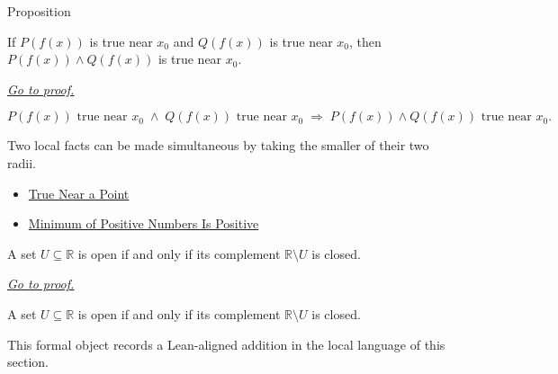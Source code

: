 \begin{propositionbox}{Proposition}
\begin{proposition}
\label{prop:true-near-stable-under-conjunction}
If \(P(f(x))\) is true near \(x_0\) and \(Q(f(x))\) is true near \(x_0\),
then \(P(f(x))\wedge Q(f(x))\) is true near \(x_0\).

\smallskip\noindent
\hyperref[prf:true-near-stable-under-conjunction]{\textit{Go to proof.}}
\end{proposition}
\end{propositionbox}

\begin{remark*}
\[
  P(f(x))\text{ true near }x_0
  \;\wedge\;
  Q(f(x))\text{ true near }x_0
  \;\Longrightarrow\;
  P(f(x))\wedge Q(f(x))\text{ true near }x_0.
\]
\end{remark*}

\begin{remark*}[Interpretation]
Two local facts can be made simultaneous by taking the smaller of their two
radii.
\end{remark*}

\begin{dependencies}
\begin{itemize}
  \item \hyperref[def:true-near]{True Near a Point}
  \item \hyperref[lem:minimum-of-positive-numbers-is-positive]{Minimum of Positive Numbers Is Positive}
\end{itemize}
\end{dependencies}

\begin{theorem}
\label{thm:open-iff-complement-closed}
A set $U\subseteq\mathbb R$ is open if and only if its complement $\mathbb R\setminus U$ is closed.

\smallskip
\noindent
\hyperref[prf:open-iff-complement-closed]{\textit{Go to proof.}}
\end{theorem}

\begin{remark*}
A set $U\subseteq\mathbb R$ is open if and only if its complement $\mathbb R\setminus U$ is closed.
\end{remark*}

\begin{remark*}[Interpretation]
This formal object records a Lean-aligned addition in the local language of this section.
\end{remark*}

\begin{dependencies}
\NoLocalDependencies
\end{dependencies}
